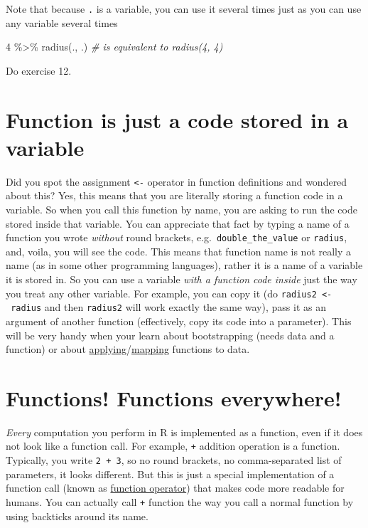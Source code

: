 \documentclass[
]{book}
\newenvironment{Shaded}{\begin{snugshade}}{\end{snugshade}}
\newcommand{\CommentTok}[1]{\textcolor[rgb]{0.56,0.35,0.01}{\textit{#1}}}
\newcommand{\DecValTok}[1]{\textcolor[rgb]{0.00,0.00,0.81}{#1}}
\newcommand{\FunctionTok}[1]{\textcolor[rgb]{0.00,0.00,0.00}{#1}}
\newcommand{\NormalTok}[1]{#1}
\newcommand{\SpecialCharTok}[1]{\textcolor[rgb]{0.00,0.00,0.00}{#1}}
\begin{document}
Note that because \texttt{.} is a variable, you can use it several times just as you can use any variable several times

\begin{Shaded}
\begin{Highlighting}[]
\DecValTok{4} \SpecialCharTok{\%\textgreater{}\%} \FunctionTok{radius}\NormalTok{(., .) }\CommentTok{\# is equivalent to radius(4, 4)}
\end{Highlighting}
\end{Shaded}

Do exercise 12.

\hypertarget{function-is-just-a-code-stored-in-a-variable}{%
\section{Function is just a code stored in a variable}\label{function-is-just-a-code-stored-in-a-variable}}

Did you spot the assignment \texttt{\textless{}-} operator in function definitions and wondered about this? Yes, this means that you are literally storing a function code in a variable. So when you call this function by name, you are asking to run the code stored inside that variable. You can appreciate that fact by typing a name of a function you wrote \emph{without} round brackets, e.g.~\texttt{double\_the\_value} or \texttt{radius}, and, voila, you will see the code. This means that function name is not really a name (as in some other programming languages), rather it is a name of a variable it is stored in. So you can use a variable \emph{with a function code inside} just the way you treat any other variable. For example, you can copy it (do \texttt{radius2\ \textless{}-\ radius} and then \texttt{radius2} will work exactly the same way), pass it as an argument of another function (effectively, copy its code into a parameter). This will be very handy when your learn about bootstrapping (needs data and a function) or about \href{https://stat.ethz.ch/R-manual/R-devel/library/base/html/apply.html}{applying}/\href{https://purrr.tidyverse.org/}{mapping} functions to data.

\hypertarget{functions-functions-everywhere}{%
\section{Functions! Functions everywhere!}\label{functions-functions-everywhere}}

\emph{Every} computation you perform in R is implemented as a function, even if it does not look like a function call. For example, \texttt{+} addition operation is a function. Typically, you write \texttt{2\ +\ 3}, so no round brackets, no comma-separated list of parameters, it looks different. But this is just a special implementation of a function call (known as \href{http://adv-r.had.co.nz/Function-operators.html}{function operator}) that makes code more readable for humans. You can actually call \texttt{+} function the way you call a normal function by using backticks around its name.
\end{document}
